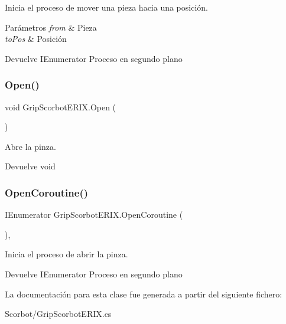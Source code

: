 Inicia el proceso de mover una pieza hacia una posición. 
\begin{DoxyParams}{Parámetros}
{\em from} & Pieza \\
\hline
{\em to\+Pos} & Posición \\
\hline
\end{DoxyParams}
\begin{DoxyReturn}{Devuelve}
I\+Enumerator Proceso en segundo plano 
\end{DoxyReturn}
\mbox{\label{class_grip_scorbot_e_r_i_x_a0c3b7287d1a56a1e7e00228a0dbe1a34}} 
\subsubsection{\texorpdfstring{Open()}{Open()}}
{\footnotesize\ttfamily void Grip\+Scorbot\+E\+R\+I\+X.\+Open (\begin{DoxyParamCaption}{ }\end{DoxyParamCaption})\hspace{0.3cm}{\ttfamily [inline]}}

Abre la pinza. \begin{DoxyReturn}{Devuelve}
void 
\end{DoxyReturn}
\mbox{\label{class_grip_scorbot_e_r_i_x_adbd6c8857d2023f488535dcb729a75d2}} 
\subsubsection{\texorpdfstring{OpenCoroutine()}{OpenCoroutine()}}
{\footnotesize\ttfamily I\+Enumerator Grip\+Scorbot\+E\+R\+I\+X.\+Open\+Coroutine (\begin{DoxyParamCaption}{ }\end{DoxyParamCaption})\hspace{0.3cm}{\ttfamily [inline]}, {\ttfamily [private]}}

Inicia el proceso de abrir la pinza. \begin{DoxyReturn}{Devuelve}
I\+Enumerator Proceso en segundo plano 
\end{DoxyReturn}


La documentación para esta clase fue generada a partir del siguiente fichero\+:\begin{DoxyCompactItemize}
\item 
Scorbot/Grip\+Scorbot\+E\+R\+I\+X.\+cs\end{DoxyCompactItemize}
